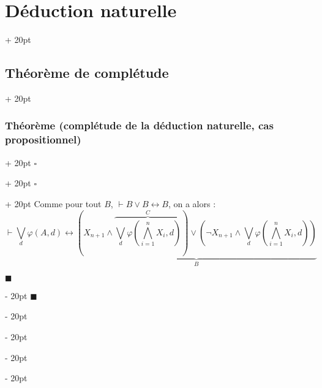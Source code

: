 \documentclass[a4paper, 12pt, twoside]{article}
\newcommand{\lr}[1]{\left( #1 \right)}
\newcommand{\ind}[1][20pt]{\advance\leftskip + #1}
\newcommand{\deind}[1][20pt]{\advance\leftskip - #1}
\newenvironment{indt}[2][20pt]{#2 \par \ind[#1]}{\par \deind} %
\newenvironment{proof}[1][{}]{\begin{indt}{$\square$ #1}}{$\blacksquare$ \end{indt}}
\begin{document}
\begin{indt}{\section{Déduction naturelle}}
\begin{indt}{\subsection{Théorème de complétude}}
\begin{indt}{\subsubsection{Théorème (complétude de la déduction naturelle, cas propositionnel)}}
\begin{proof}
\begin{proof}
                        Comme pour tout $B$, $\vdash B \vee B \leftrightarrow B$, on a alors :
                        \[
                            \vdash
                            \bigvee_d \varphi(A, d)
                            \leftrightarrow
                            \underbrace{
                                \lr{
                                    X_{n + 1}
                                    \wedge
                                    \overbrace{
                                        \bigvee_d \varphi\!\lr{\bigwedge_{i = 1}^n X_i, d}
                                    }^C
                                }
                                \vee
                                \lr{
                                    \neg X_{n + 1}
                                    \wedge
                                    \bigvee_d \varphi\!\lr{\bigwedge_{i = 1}^n X_i, d}
                                }
                            }_{B}
                        \]


\end{proof}
\end{proof}
\end{indt}
\end{indt}
\end{indt}
\end{document}

